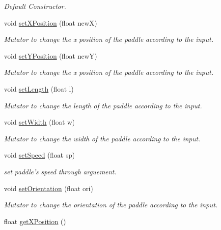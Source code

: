 \begin{DoxyCompactItemize}
\begin{DoxyCompactList}\small\item\em Default Constructor. \end{DoxyCompactList}\item 
void \hyperlink{classPlayer_a3d91e6c646470b645bdb302318ba9998}{set\+X\+Position} (float new\+X)
\begin{DoxyCompactList}\small\item\em Mutator to change the x position of the paddle according to the input. \end{DoxyCompactList}\item 
void \hyperlink{classPlayer_a593a81af1e971fa6410f5ee980ac0c0e}{set\+Y\+Position} (float new\+Y)
\begin{DoxyCompactList}\small\item\em Mutator to change the x position of the paddle according to the input. \end{DoxyCompactList}\item 
void \hyperlink{classPlayer_a7fbd49a140da0e4c40122040456d3542}{set\+Length} (float l)
\begin{DoxyCompactList}\small\item\em Mutator to change the length of the paddle according to the input. \end{DoxyCompactList}\item 
void \hyperlink{classPlayer_a2c37171e8a3aafcedb8f89127d77ed03}{set\+Width} (float w)
\begin{DoxyCompactList}\small\item\em Mutator to change the width of the paddle according to the input. \end{DoxyCompactList}\item 
void \hyperlink{classPlayer_a3bd54fb199f66e8320b1204c75cf10f3}{set\+Speed} (float sp)
\begin{DoxyCompactList}\small\item\em set paddle's speed through arguement. \end{DoxyCompactList}\item 
void \hyperlink{classPlayer_ad7b5956c42a1ce32c536f4ac436ff10d}{set\+Orientation} (float ori)
\begin{DoxyCompactList}\small\item\em Mutator to change the orientation of the paddle according to the input. \end{DoxyCompactList}\item 
\hypertarget{classPlayer_a60127b852551bc42cdd0ad3a5ce84c39}{float \hyperlink{classPlayer_a60127b852551bc42cdd0ad3a5ce84c39}{get\+X\+Position} ()}\label{classPlayer_a60127b852551bc42cdd0ad3a5ce84c39}


\end{DoxyCompactItemize}
